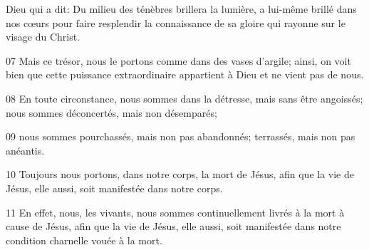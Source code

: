 Dieu qui a dit: Du milieu des ténèbres brillera la lumière, a lui-même brillé dans nos cœurs pour faire resplendir la connaissance de sa gloire qui rayonne sur le visage du Christ.

07 Mais ce trésor, nous le portons comme dans des vases d’argile; ainsi, on voit bien que cette puissance extraordinaire appartient à Dieu et ne vient pas de nous.

08 En toute circonstance, nous sommes dans la détresse, mais sans être angoissés; nous sommes déconcertés, mais non désemparés;

09 nous sommes pourchassés, mais non pas abandonnés; terrassés, mais non pas anéantis.

10 Toujours nous portons, dans notre corps, la mort de Jésus, afin que la vie de Jésus, elle aussi, soit manifestée dans notre corps.

11 En effet, nous, les vivants, nous sommes continuellement livrés à la mort à cause de Jésus, afin que la vie de Jésus, elle aussi, soit manifestée dans notre condition charnelle vouée à la mort.